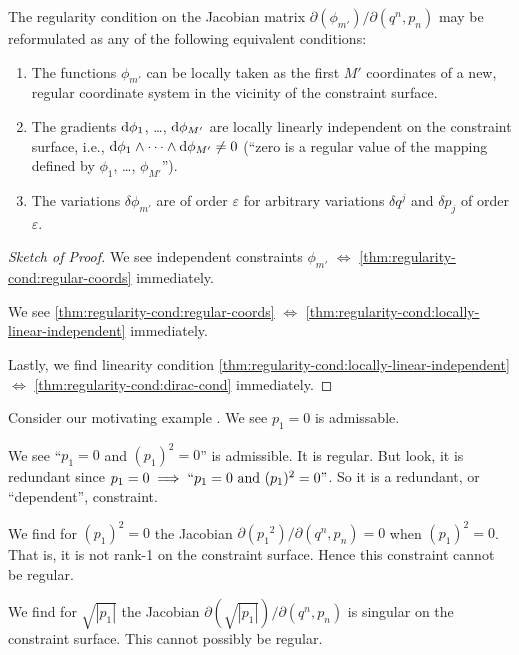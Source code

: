 \begin{thm}
The regularity condition on the Jacobian matrix
$\partial(\phi_{m'})/\partial(q^{n},p_{n})$ may be reformulated as any
of the following equivalent conditions:
\begin{enumerate}
\item\label{thm:regularity-cond:regular-coords}
  The functions $\phi_{m'}$ can be locally taken as the first $M'$
  coordinates of a new, regular coordinate system in the vicinity of the
  constraint surface.
\item\label{thm:regularity-cond:locally-linear-independent}
  The gradients $\mathrm{d}\phi_{1}$, \dots, $\mathrm{d}\phi_{M'}$ are locally
  linearly independent on the constraint surface, i.e.,
  $\mathrm{d}\phi_{1}\wedge\cdots\wedge\mathrm{d}\phi_{M'}\neq0$ (``zero is a regular
  value of the mapping defined by $\phi_{1}$, \dots, $\phi_{M'}$'').
\item\label{thm:regularity-cond:dirac-cond}
  The variations $\delta\phi_{m'}$ are of order $\varepsilon$ for
  arbitrary variations $\delta q^{j}$ and $\delta p_{j}$ of order
  $\varepsilon$.
\end{enumerate}
\end{thm}
\begin{proof}[Sketch of Proof]
We see independent constraints $\phi_{m'}$ $\iff$ \eqref{thm:regularity-cond:regular-coords}
immediately.

We see \eqref{thm:regularity-cond:regular-coords} $\iff$ \eqref{thm:regularity-cond:locally-linear-independent}
immediately.

Lastly, we find linearity condition \eqref{thm:regularity-cond:locally-linear-independent} $\iff$ \eqref{thm:regularity-cond:dirac-cond}
immediately.
\end{proof}

Consider our motivating example .
We see $p_{1}=0$ is admissable.

We see ``$p_{1}=0$ and $(p_{1})^{2}=0$'' is admissible. It is
regular. But look, it is redundant since $p_{1}=0\implies``p_{1}=0%
\mbox{\ and\ } (p_{1})^{2}=0"$. So it is a redundant, or ``dependent'',
constraint.

We find for $(p_{1})^{2}=0$ the Jacobian
$\partial({p_{1}}^{2})/\partial(q^{n}, p_{n})=0$ when
$(p_{1})^{2}=0$. That is, it is not rank-1 on the constraint
surface. Hence this constraint cannot be regular.

We find for $\sqrt{|p_{1}|}$ the Jacobian
$\partial(\sqrt{|p_{1}|})/\partial(q^{n},p_{n})$ is singular on the
constraint surface. This cannot possibly be regular.

